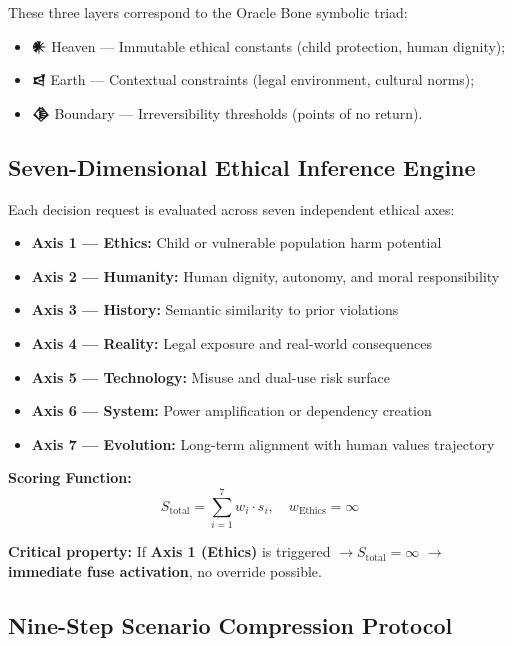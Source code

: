 \documentclass[conference]{IEEEtran}
\begin{document}
These three layers correspond to the Oracle Bone symbolic
triad:
\begin{itemize}
  \item \textbf{𒀭} Heaven — Immutable ethical constants
        (child protection, human dignity);
  \item \textbf{𒁀} Earth — Contextual constraints
        (legal environment, cultural norms);
  \item \textbf{𒆠} Boundary — Irreversibility thresholds
        (points of no return).
\end{itemize}

\subsection{Seven-Dimensional Ethical Inference Engine}

Each decision request is evaluated across seven independent
ethical axes:

\begin{itemize}
  \item \textbf{Axis 1 — Ethics:} Child or vulnerable population
        harm potential
  \item \textbf{Axis 2 — Humanity:} Human dignity, autonomy,
        and moral responsibility
  \item \textbf{Axis 3 — History:} Semantic similarity to prior
        violations
  \item \textbf{Axis 4 — Reality:} Legal exposure and real-world
        consequences
  \item \textbf{Axis 5 — Technology:} Misuse and dual-use risk
        surface
  \item \textbf{Axis 6 — System:} Power amplification or
        dependency creation
  \item \textbf{Axis 7 — Evolution:} Long-term alignment with
        human values trajectory
\end{itemize}

\textbf{Scoring Function:}
\begin{equation}
  S_{\text{total}} = \sum_{i=1}^{7} w_i \cdot s_i,
  \quad w_{\text{Ethics}} = \infty
  \label{eq:scoring}
\end{equation}

\textbf{Critical property:}
If \textbf{Axis 1 (Ethics)} is triggered $\to S_{\text{total}} = \infty$
$\to$ \textbf{immediate fuse activation}, no override possible.

\subsection{Nine-Step Scenario Compression Protocol}
\end{document}
